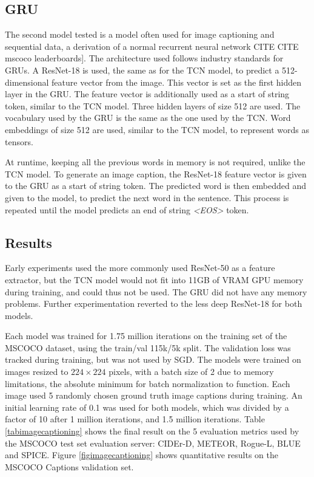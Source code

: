\documentclass[a4paper, twoside]{article}
\begin{document}
\subsection{GRU}
The second model tested is a model often used for image captioning and sequential data, a derivation of a normal recurrent neural network \cite{cs231n} CITE CITE mscoco leaderboards]. The architecture used follows industry standards for GRUs. A ResNet-18 is used, the same as for the TCN model, to predict a 512-dimensional feature vector from the image. This vector is set as the first hidden layer in the GRU. The feature vector is additionally used as a start of string token, similar to the TCN model. Three hidden layers of size 512 are used. The vocabulary used by the GRU is the same as the one used by the TCN. Word embeddings of size 512 are used, similar to the TCN model, to represent words as tensors.

At runtime, keeping all the previous words in memory is not required, unlike the TCN model. To generate an image caption, the ResNet-18 feature vector is given to the GRU as a start of string token. The predicted word is then embedded and given to the model, to predict the next word in the sentence. This process is repeated until the model predicts an end of string \textit{<EOS>} token.

\subsection{Results}
Early experiments used the more commonly used ResNet-50 as a feature extractor, but the TCN model would not fit into 11GB of VRAM GPU memory during training, and could thus not be used. The GRU did not have any memory problems. Further experimentation reverted to the less deep ResNet-18 for both models.

Each model was trained for 1.75 million iterations on the training set of the MSCOCO dataset, using the train/val 115k/5k split. The validation loss was tracked during training, but was not used by SGD. The models were trained on images resized to $224 \times 224$ pixels, with a batch size of 2 due to memory limitations, the absolute minimum for batch normalization to function. Each image used 5 randomly chosen ground truth image captions during training. An initial learning rate of 0.1 was used for both models, which was divided by a factor of 10 after 1 million iterations, and 1.5 million iterations. Table \ref{tabimagecaptioning} shows the final result on the 5 evaluation metrics used by the MSCOCO test set evaluation server: CIDEr-D, METEOR, Rogue-L, BLUE and SPICE. Figure \ref{figimagecaptioning} shows quantitative results on the MSCOCO Captions validation set.
\end{document}

